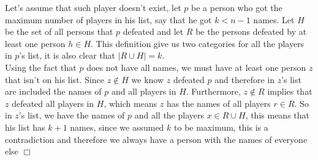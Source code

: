 \begin{solution}[By Contradiction]
    Let's assume that such player doesn't exist, let $p$ be a person who got the maximum number of players in his list, say that he got $k<n-1$ names. Let $H$ be the set of all persons that $p$ defeated and let $R$ be the persons defeated by at least one person $h \in H$. This definition give us two categories for all the players in $p$'s list, it is also clear that $|R \cup H| = k$. \vspace{3mm}\\
     Using the fact that $p$ does not have all names, we must have at least one person $z$ that isn't on his list. Since $z \notin H$ we know $z$ defeated $p$ and therefore in $z$'s list are included the names of $p$ and all players in $H$. Furthermore, $z \notin R$ implies that $z$ defeated all players in $H$, which means $z$ has the names of all players $r\in R$. So in $z$'s list, we have the names of $p$ and all the players $x \in R \cup H$, this means that his list has $k+1$ names, since we assumed $k$ to be maximum, this is a contradiction and therefore we always have a person with the names of everyone else $\Box$
    
    \vspace{-3mm}
    \begin{center}
    \end{center}
\end{solution}

